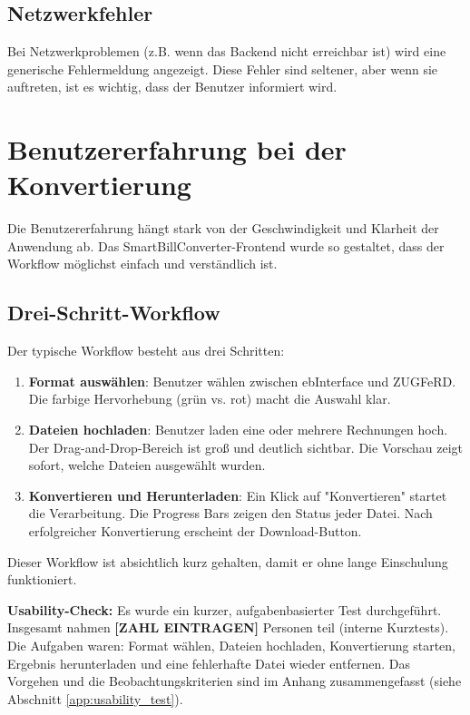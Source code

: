 \subsection{Netzwerkfehler}

Bei Netzwerkproblemen (z.B. wenn das Backend nicht erreichbar ist) wird eine generische Fehlermeldung angezeigt. Diese Fehler sind seltener, aber wenn sie auftreten, ist es wichtig, dass der Benutzer informiert wird.

\section{Benutzererfahrung bei der Konvertierung}

Die Benutzererfahrung hängt stark von der Geschwindigkeit und Klarheit der Anwendung ab. Das SmartBillConverter-Frontend wurde so gestaltet, dass der Workflow möglichst einfach und verständlich ist.

\subsection{Drei-Schritt-Workflow}

Der typische Workflow besteht aus drei Schritten:

\begin{enumerate}
    \item \textbf{Format auswählen}: Benutzer wählen zwischen ebInterface und ZUGFeRD. Die farbige Hervorhebung (grün vs. rot) macht die Auswahl klar.
    
    \item \textbf{Dateien hochladen}: Benutzer laden eine oder mehrere Rechnungen hoch. Der Drag-and-Drop-Bereich ist groß und deutlich sichtbar. Die Vorschau zeigt sofort, welche Dateien ausgewählt wurden.
    
    \item \textbf{Konvertieren und Herunterladen}: Ein Klick auf "Konvertieren" startet die Verarbeitung. Die Progress Bars zeigen den Status jeder Datei. Nach erfolgreicher Konvertierung erscheint der Download-Button.
\end{enumerate}

Dieser Workflow ist absichtlich kurz gehalten, damit er ohne lange Einschulung funktioniert.

\textbf{Usability-Check:} Es wurde ein kurzer, aufgabenbasierter Test durchgeführt. Insgesamt nahmen \textbf{[ZAHL EINTRAGEN]} Personen teil (interne Kurztests). Die Aufgaben waren: Format wählen, Dateien hochladen, Konvertierung starten, Ergebnis herunterladen und eine fehlerhafte Datei wieder entfernen. Das Vorgehen und die Beobachtungskriterien sind im Anhang zusammengefasst (siehe Abschnitt \ref{app:usability_test}).

